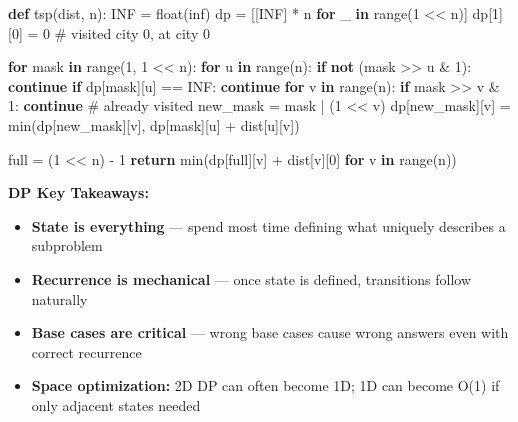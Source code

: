 \documentclass[11pt]{article}
\providecommand{\tightlist}{\setlength{\itemsep}{1pt}\setlength{\parskip}{0pt}}
\newenvironment{Shaded}{\begin{snugshade}}{\end{snugshade}}
\newcommand{\BuiltInTok}[1]{\textcolor[rgb]{0.50,0.55,0.55}{#1}}
\newcommand{\CommentTok}[1]{\textcolor[rgb]{0.48,0.49,0.49}{#1}}
\newcommand{\ControlFlowTok}[1]{\textcolor[rgb]{0.99,0.74,0.29}{\textbf{#1}}}
\newcommand{\DecValTok}[1]{\textcolor[rgb]{0.96,0.45,0.00}{#1}}
\newcommand{\KeywordTok}[1]{\textcolor[rgb]{0.81,0.81,0.76}{\textbf{#1}}}
\newcommand{\NormalTok}[1]{\textcolor[rgb]{0.81,0.81,0.76}{#1}}
\newcommand{\OperatorTok}[1]{\textcolor[rgb]{0.81,0.81,0.76}{#1}}
\newcommand{\StringTok}[1]{\textcolor[rgb]{0.96,0.31,0.31}{#1}}
\begin{document}
\begin{Shaded}
\begin{Highlighting}[]
\KeywordTok{def}\NormalTok{ tsp(dist, n):}
\NormalTok{    INF }\OperatorTok{=} \BuiltInTok{float}\NormalTok{(}\StringTok{\textquotesingle{}inf\textquotesingle{}}\NormalTok{)}
\NormalTok{    dp }\OperatorTok{=}\NormalTok{ [[INF] }\OperatorTok{*}\NormalTok{ n }\ControlFlowTok{for}\NormalTok{ \_ }\KeywordTok{in} \BuiltInTok{range}\NormalTok{(}\DecValTok{1} \OperatorTok{\textless{}\textless{}}\NormalTok{ n)]}
\NormalTok{    dp[}\DecValTok{1}\NormalTok{][}\DecValTok{0}\NormalTok{] }\OperatorTok{=} \DecValTok{0}   \CommentTok{\# visited city 0, at city 0}

    \ControlFlowTok{for}\NormalTok{ mask }\KeywordTok{in} \BuiltInTok{range}\NormalTok{(}\DecValTok{1}\NormalTok{, }\DecValTok{1} \OperatorTok{\textless{}\textless{}}\NormalTok{ n):}
        \ControlFlowTok{for}\NormalTok{ u }\KeywordTok{in} \BuiltInTok{range}\NormalTok{(n):}
            \ControlFlowTok{if} \KeywordTok{not}\NormalTok{ (mask }\OperatorTok{\textgreater{}\textgreater{}}\NormalTok{ u }\OperatorTok{\&} \DecValTok{1}\NormalTok{): }\ControlFlowTok{continue}
            \ControlFlowTok{if}\NormalTok{ dp[mask][u] }\OperatorTok{==}\NormalTok{ INF: }\ControlFlowTok{continue}
            \ControlFlowTok{for}\NormalTok{ v }\KeywordTok{in} \BuiltInTok{range}\NormalTok{(n):}
                \ControlFlowTok{if}\NormalTok{ mask }\OperatorTok{\textgreater{}\textgreater{}}\NormalTok{ v }\OperatorTok{\&} \DecValTok{1}\NormalTok{: }\ControlFlowTok{continue}   \CommentTok{\# already visited}
\NormalTok{                new\_mask }\OperatorTok{=}\NormalTok{ mask }\OperatorTok{|}\NormalTok{ (}\DecValTok{1} \OperatorTok{\textless{}\textless{}}\NormalTok{ v)}
\NormalTok{                dp[new\_mask][v] }\OperatorTok{=} \BuiltInTok{min}\NormalTok{(dp[new\_mask][v], dp[mask][u] }\OperatorTok{+}\NormalTok{ dist[u][v])}

\NormalTok{    full }\OperatorTok{=}\NormalTok{ (}\DecValTok{1} \OperatorTok{\textless{}\textless{}}\NormalTok{ n) }\OperatorTok{{-}} \DecValTok{1}
    \ControlFlowTok{return} \BuiltInTok{min}\NormalTok{(dp[full][v] }\OperatorTok{+}\NormalTok{ dist[v][}\DecValTok{0}\NormalTok{] }\ControlFlowTok{for}\NormalTok{ v }\KeywordTok{in} \BuiltInTok{range}\NormalTok{(n))}
\end{Highlighting}
\end{Shaded}

\textbf{DP Key Takeaways:}

\begin{itemize}
\tightlist
\item
  \textbf{State is everything} --- spend most time defining what uniquely describes a subproblem
\item
  \textbf{Recurrence is mechanical} --- once state is defined, transitions follow naturally
\item
  \textbf{Base cases are critical} --- wrong base cases cause wrong answers even with correct recurrence
\item
  \textbf{Space optimization:} 2D DP can often become 1D; 1D can become O(1) if only adjacent states needed
\end{itemize}
\end{document}

